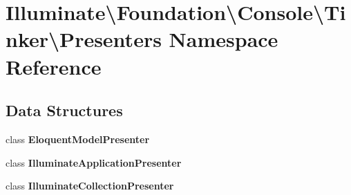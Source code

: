 \section{Illuminate\textbackslash{}Foundation\textbackslash{}Console\textbackslash{}Tinker\textbackslash{}Presenters Namespace Reference}
\label{namespace_illuminate_1_1_foundation_1_1_console_1_1_tinker_1_1_presenters}
\subsection*{Data Structures}
\begin{DoxyCompactItemize}
\item 
class {\bf Eloquent\+Model\+Presenter}
\item 
class {\bf Illuminate\+Application\+Presenter}
\item 
class {\bf Illuminate\+Collection\+Presenter}
\end{DoxyCompactItemize}
